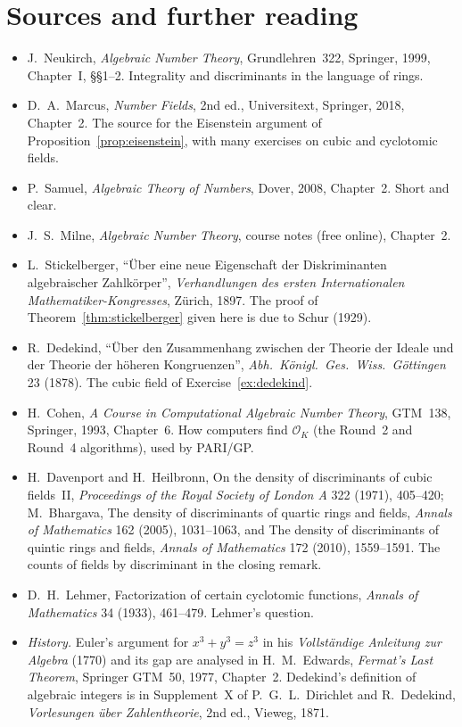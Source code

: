 \section*{Sources and further reading}

\begin{itemize}
\item J.~Neukirch, \emph{Algebraic Number Theory}, Grundlehren~322, Springer, 1999, Chapter~I, \S\S1--2. Integrality and
discriminants in the language of rings.
\item D.~A.~Marcus, \emph{Number Fields}, 2nd ed., Universitext, Springer, 2018, Chapter~2. The source for the Eisenstein
argument of Proposition~\ref{prop:eisenstein}, with many exercises on cubic and cyclotomic fields.
\item P.~Samuel, \emph{Algebraic Theory of Numbers}, Dover, 2008, Chapter~2. Short and clear.
\item J.~S.~Milne, \emph{Algebraic Number Theory}, course notes (free online), Chapter~2.
\item L.~Stickelberger, ``\"Uber eine neue Eigenschaft der Diskriminanten algebraischer Zahlk\"orper'', \emph{Verhandlungen
des ersten Internationalen Mathematiker-Kongresses}, Z\"urich, 1897. The proof of Theorem~\ref{thm:stickelberger} given
here is due to Schur (1929).
\item R.~Dedekind, ``\"Uber den Zusammenhang zwischen der Theorie der Ideale und der Theorie der h\"oheren Kongruenzen'',
\emph{Abh.\ K\"onigl.\ Ges.\ Wiss.\ G\"ottingen} 23 (1878). The cubic field of Exercise~\ref{ex:dedekind}.
\item H.~Cohen, \emph{A Course in Computational Algebraic Number Theory}, GTM~138, Springer, 1993, Chapter~6. How
computers find $\mathcal O_K$ (the Round~2 and Round~4 algorithms), used by PARI/GP.
\item H.~Davenport and H.~Heilbronn, On the density of discriminants of cubic fields~II, \emph{Proceedings of the Royal Society of London A} 322 (1971), 405--420; M.~Bhargava, The density of discriminants of quartic rings and fields, \emph{Annals of Mathematics} 162 (2005), 1031--1063, and The density of discriminants of quintic rings and fields, \emph{Annals of Mathematics} 172 (2010), 1559--1591. The counts of fields by discriminant in the closing remark.
\item D.~H.~Lehmer, Factorization of certain cyclotomic functions, \emph{Annals of Mathematics} 34 (1933), 461--479. Lehmer's question.
\item \emph{History.} Euler's argument for $x^3+y^3=z^3$ in his \emph{Vollst\"andige Anleitung zur Algebra} (1770) and its gap are
analysed in H.~M.~Edwards, \emph{Fermat's Last Theorem}, Springer GTM~50, 1977, Chapter~2. Dedekind's definition of algebraic
integers is in Supplement~X of P.~G.~L.~Dirichlet and R.~Dedekind, \emph{Vorlesungen \"uber Zahlentheorie}, 2nd ed., Vieweg, 1871.
\end{itemize}
